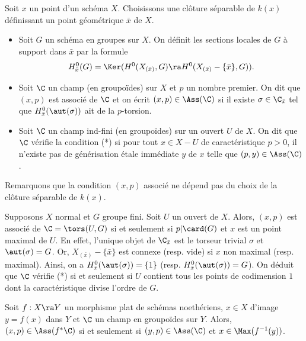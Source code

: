 \documentclass[10pt]{../fichiers-configuration-latex/smfart}
\begin{document}
\begin{definition2}\label{20defass}Soit $x$ un point d'un schéma $X$. Choisissons une clôture
séparable de $k(x)$ définissant un point géométrique $\bar x$ de $X$.  \begin{itemize} \item[(i)]
Soit $G$ un schéma en groupes sur $X$. On définit les sections locales de $G$ à support dans $\bar
x$ par la formule $$H^0_{\bar x}(G)=\Ker(H^0(X_{(\bar x)},G)\ra H^0(X_{(\bar x)}-\{\bar x\},G)).$$
\item[(ii)] Soit $\C$ un champ (en groupoïdes)  sur $X$ et $p$ un nombre premier. On dit que $(x,p)$
est associé de $\C$ et on écrit $(x,p)\in \Ass(\C)$ si il existe $\sigma\in\C_{\bar x}$ tel que
$H^0_{\bar x}(\aut(\sigma))$ ait de la $p$-torsion.  \item[(iii)] Soit $\C$ un champ ind-fini (en
groupoïdes) sur un ouvert $U$ de $X$. On dit que $\C$ vérifie la condition (*) si pour tout $x\in
X-U$ de caractéristique $p>0$, il n'existe pas de générisation étale immédiate $y$ de $x$ telle que
$(p,y)\in\Ass(\C)$.  \end{itemize} \end{definition2}

Remarquons que la condition $(x,p)$ associé ne dépend pas du choix de la clôture séparable de
$k(x)$.

\begin{exemple2}\label{20exetoile} Supposons $X$ normal et $G$ groupe fini. Soit $U$ un ouvert de
$X$. Alors, $(x,p)$ est associé de $\C=\tors(U,G)$ si et seulement si $p|\card(G)$ et $x$ est un
point maximal de $U$. En effet, l'unique objet de $\C_{\bar x}$ est le torseur trivial $\sigma$ et
$\aut(\sigma)=G$. Or, $X_{(\bar x)}-\{\bar x\}$ est connexe (resp. vide) si $x$ non maximal (resp.
maximal). Ainsi, on a $H^0_{\bar x}(\aut(\sigma))=\{1\}$ (resp. $H^0_{\bar x}(\aut(\sigma))=G$). On
déduit que $\C$ vérifie (*) si et seulement si $U$ contient tous les points de codimension $1$ dont
la caractéristique divise l'ordre de $G$.  \end{exemple2}

\begin{lemme2}\label{20ass-comp} Soit $f:X\ra Y$ un morphisme plat de schémas noethériens, $x\in X$
d'image $y=f(x)$ dans $Y$  et $\C$ un champ en groupoïdes sur $Y$. Alors, $(x,p)\in\Ass(f^*\C)$ si
et seulement si $(y,p)\in\Ass(\C)$ et $x\in\Max(f^{-1}(y))$.  \end{lemme2}
\end{document}
